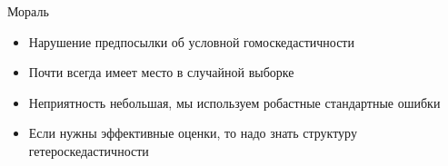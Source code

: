 \documentclass[ignorenonframetext,]{beamer}
\begin{document}
\begin{frame}{Мораль}

\begin{itemize}
\item
  Нарушение предпосылки об условной гомоскедастичности
\item
  Почти всегда имеет место в случайной выборке
\item
  Неприятность небольшая, мы используем робастные стандартные ошибки
\item
  Если нужны эффективные оценки, то надо знать структуру
  гетероскедастичности
\end{itemize}

\end{frame}
\end{document}
